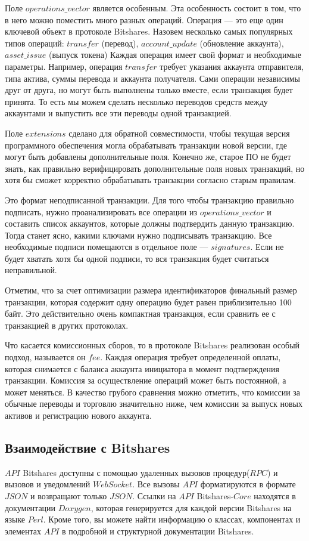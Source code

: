 \documentclass[a4paper, 14pt]{extarticle}
\begin{document}
Поле $operations\_vector$ является особенным. Эта особенность состоит в том, что в него можно поместить много разных операций. Операция — это еще один ключевой объект в протоколе Bitshares. Назовем несколько самых популярных типов операций: $transfer$ (перевод), $account\_update$ (обновление аккаунта), $asset\_issue$ (выпуск токена) Каждая операция имеет свой формат и необходимые параметры. Например, операция $transfer$ требует указания аккаунта отправителя, типа актива, суммы перевода и аккаунта получателя. Сами операции независимы друг от друга, но могут быть выполнены только вместе, если транзакция будет принята. То есть мы можем сделать несколько переводов средств между аккаунтами и выпустить все эти переводы одной транзакцией.

Поле $extensions$ сделано для обратной совместимости, чтобы текущая версия программного обеспечения могла обрабатывать транзакции новой версии, где могут быть добавлены дополнительные поля. Конечно же, старое ПО не будет знать, как правильно верифицировать дополнительные поля новых транзакций, но хотя бы сможет корректно обрабатывать транзакции согласно старым правилам.

Это формат неподписанной транзакции. Для того чтобы транзакцию правильно подписать, нужно проанализировать все операции из $operations\_vector$ и составить список аккаунтов, которые должны подтвердить данную транзакцию. Тогда станет ясно, какими ключами нужно подписывать транзакцию. Все необходимые подписи помещаются в отдельное поле — $signatures$. Если не будет хватать хотя бы одной подписи, то вся транзакция будет считаться неправильной.

Отметим, что за счет оптимизации размера идентификаторов финальный размер транзакции, которая содержит одну операцию будет равен приблизительно 100 байт. Это действительно очень компактная транзакция, если сравнить ее с транзакцией в других протоколах.

Что касается комиссионных сборов, то в протоколе Bitshares реализован особый подход, называется он $fee$. Каждая операция требует определенной оплаты, которая снимается с баланса аккаунта инициатора в момент подтверждения транзакции. Комиссия за осуществление операций может быть постоянной, а может меняться. В качество грубого сравнения можно отметить, что комиссии за обычные переводы и торговлю значительно ниже, чем комиссии за выпуск новых активов и регистрацию нового аккаунта.

\subsection{Взаимодействие с Bitshares}
$API$ Bitshares доступны с помощью удаленных вызовов процедур($RPC$) и вызовов и уведомлений $WebSocket$. Все вызовы $API$ форматируются в формате $JSON$ и возвращают только $JSON$. Ссылки на $API$ Bitshares-$Core$ находятся в документации $Doxygen$, которая генерируется для каждой версии Bitshares на языке $Perl$. Кроме того, вы можете найти информацию о классах, компонентах и элементах $API$ в подробной и структурной документации Bitshares.
\end{document}
